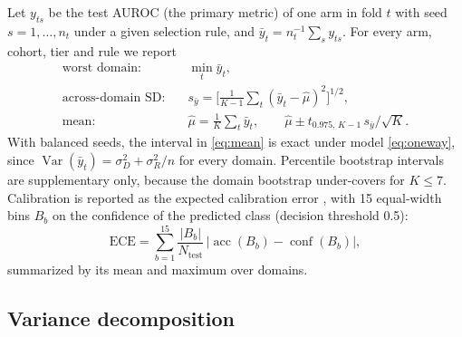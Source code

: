 Let $y_{ts}$ be the test AUROC (the primary metric) of one arm in fold $t$
with seed $s=1,\dots,n_t$ under a given selection rule, and
$\bar y_t=n_t^{-1}\sum_s y_{ts}$. For every arm, cohort, tier and rule we report
\begin{align}
  \text{worst domain:}\quad & \min_t \bar y_t, \label{eq:worst}\\
  \text{across-domain SD:}\quad & s_{\bar y}=\Big[\tfrac{1}{K-1}\textstyle\sum_t(\bar y_t-\hat\mu)^2\Big]^{1/2},
     \label{eq:sdacross}\\
  \text{mean:}\quad & \hat\mu = \tfrac{1}{K}\textstyle\sum_t \bar y_t,\qquad
     \hat\mu \pm t_{0.975,\,K-1}\, s_{\bar y}/\sqrt{K}. \label{eq:mean}
\end{align}
With balanced seeds, the interval in \eqref{eq:mean} is exact under model
\eqref{eq:oneway}, since $\operatorname{Var}(\bar y_t)=\sigma_D^2+\sigma_R^2/n$
for every domain. Percentile bootstrap intervals \citep{efron1993bootstrap}
are supplementary only, because the domain bootstrap under-covers for $K\le7$.
Calibration is reported as the expected calibration error
\citep{naeini2015ece,guo2017calibration}, with 15 equal-width bins $B_b$ on the
confidence of the predicted class (decision threshold 0.5):
\begin{equation}
  \mathrm{ECE}=\sum_{b=1}^{15}\frac{|B_b|}{N_{\text{test}}}\,
  \big|\operatorname{acc}(B_b)-\operatorname{conf}(B_b)\big|,
  \label{eq:ece}
\end{equation}
summarized by its mean and maximum over domains.

\subsection{Variance decomposition}
\label{sec:protocol-variance}

